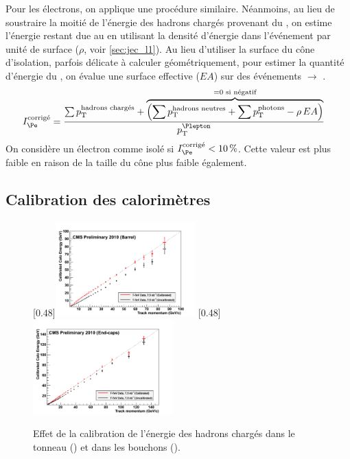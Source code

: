 Pour les électrons, on applique une procédure similaire. Néanmoins, au lieu de soustraire la moitié de l'énergie des hadrons chargés provenant du \pu, on estime l'énergie restant due au \pu en utilisant la densité d'énergie dans l'événement par unité de surface ($\rho$, voir \cref{sec:jec_l1}). Au lieu d'utiliser la surface du cône d'isolation, parfois délicate à calculer géométriquement, pour estimer la quantité d'énergie du \pu, on évalue une surface effective ($EA$) sur des événements \PZ $\rightarrow$ \Pelectron{}\Ppositron.%
\begin{align*}
  I_{\Pe}^\text{corrigé} &= \frac{\sum{\pt^\text{hadrons chargés}} + \overbrace{\left(\sum{\pt^\text{hadrons neutres}} + \sum{\pt^\text{photons}} - \rho\,EA \right)}^{= 0 \text{ si négatif}}}{\pt^{\Plepton}}
\end{align*}
On considère un électron comme isolé si $I_{\Pe}^\text{corrigé} < \SI{10}{\%}$. Cette valeur est plus faible en raison de la taille du cône plus faible également.

\subsection{Calibration des calorimètres}

\begin{figure}[tbp]
    \centering
    \subcaptionbox{\label{fig:hadron_calib_barrel}}[0.48\textwidth]{\includegraphics[width=0.48\textwidth]{chapitre3/figs/hadron_calib_barrel.png}} \hfill
    \subcaptionbox{\label{fig:hadron_calib_endcap}}[0.48\textwidth]{\includegraphics[width=0.48\textwidth]{chapitre3/figs/hadron_calib_endcap.png}}
    \caption{Effet de la calibration de l'énergie des hadrons chargés dans le tonneau () et dans les bouchons ().}
    \label{fig:hadron_calib}
\end{figure}


